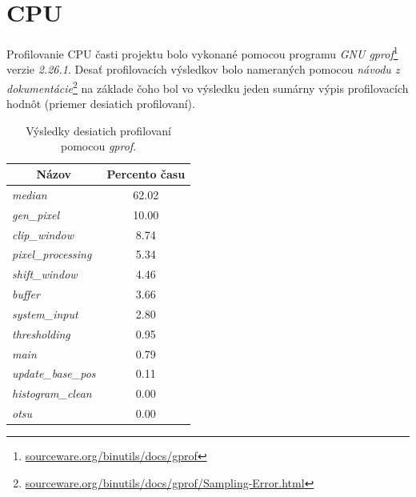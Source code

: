 \documentclass[11pt,a4paper]{article}
\begin{document}
\newpage
\section{CPU}

Profilovanie CPU časti projektu bolo vykonané pomocou programu \textit{GNU gprof}\footnote{\href{https://sourceware.org/binutils/docs/gprof/}{sourceware.org/binutils/docs/gprof}} verzie \textit{2.26.1}. Desať profilovacích výsledkov bolo nameraných pomocou \textit{návodu z dokumentácie}\footnote{\href{https://sourceware.org/binutils/docs/gprof/Sampling-Error.html}{sourceware.org/binutils/docs/gprof/Sampling-Error.html}} na základe čoho bol vo výsledku jeden sumárny výpis profilovacích hodnôt (priemer desiatich profilovaní).\\

\begin{table}[H]
  \begin{center}
    \begin{tabular}{l|c}
        \multicolumn{1}{c|}{\textbf{Názov}} & \multicolumn{1}{c}{\textbf{Percento času}}\\
        \hline
        \textit{median}            & 62.02 \\
        \textit{gen\_pixel}        & 10.00 \\
        \textit{clip\_window}      & 8.74 \\
        \textit{pixel\_processing} & 5.34 \\
        \textit{shift\_window}     & 4.46 \\
        \textit{buffer}            & 3.66 \\
        \textit{system\_input}     & 2.80 \\
        \textit{thresholding}      & 0.95 \\
        \textit{main}              & 0.79 \\
        \textit{update\_base\_pos} & 0.11 \\
        \textit{histogram\_clean}  & 0.00 \\
        \textit{otsu}              & 0.00 \\
    \end{tabular}
    \caption{Výsledky desiatich profilovaní pomocou \textit{gprof}.}
    \label{tab:gprof}
  \end{center}
\end{table}
\end{document}
